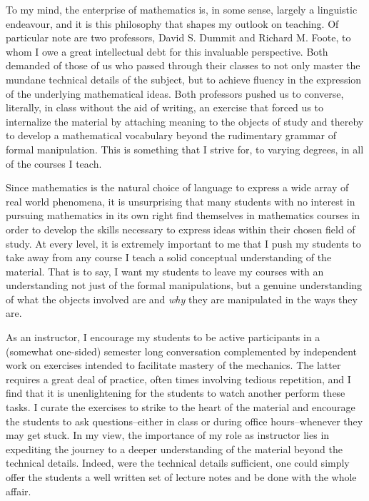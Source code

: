 To my mind, the enterprise of mathematics is, in some sense, largely a linguistic endeavour, and it is this philosophy that shapes my outlook on teaching.
Of particular note are two professors, David S. Dummit and Richard M. Foote, to whom I owe a great intellectual debt for this invaluable perspective.
Both demanded of those of us who passed through their classes to not only master the mundane technical details of the subject, but to achieve fluency in the expression of the underlying mathematical ideas.
Both professors pushed us to converse, literally, in class without the aid of writing, an exercise that forced us to internalize the material by attaching meaning to the objects of study and thereby to develop a mathematical vocabulary beyond the rudimentary grammar of formal manipulation.
This is something that I strive for, to varying degrees, in all of the courses I teach.

Since mathematics is the natural choice of language to express a wide array of real world phenomena, it is unsurprising that many students with no interest in pursuing mathematics in its own right find themselves in mathematics courses in order to develop the skills necessary to express ideas within their chosen field of study.
At every level, it is extremely important to me that I push my students to take away from any course I teach a solid conceptual understanding of the material.
That is to say, I want my students to leave my courses with an understanding not just of the formal manipulations, but a genuine understanding of what the objects involved are and \textit{why} they are manipulated in the ways they are.

As an instructor, I encourage my students to be active participants in a (somewhat one-sided) semester long conversation complemented by independent work on exercises intended to facilitate mastery of the mechanics.
The latter requires a great deal of practice, often times involving tedious repetition, and I find that it is unenlightening for the students to watch another perform these tasks.
I curate the exercises to strike to the heart of the material and encourage the students to ask questions--either in class or during office hours--whenever they may get stuck.
In my view, the importance of my role as instructor lies in expediting the journey to a deeper understanding of the material beyond the technical details.
Indeed, were the technical details sufficient, one could simply offer the students a well written set of lecture notes and be done with the whole affair.

